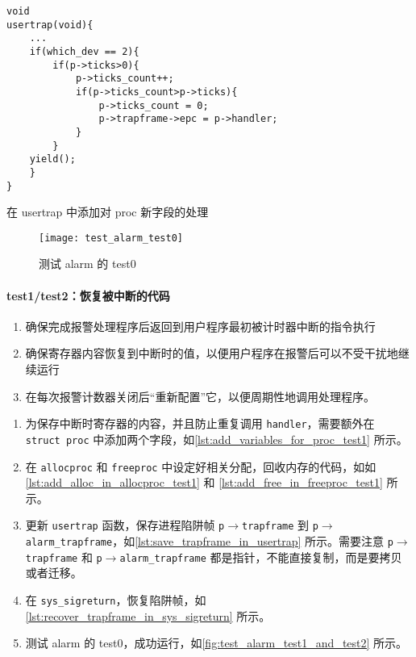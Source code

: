 \begin{listing}[!htb]
	\begin{verbatim}
void
usertrap(void){
    ...
    if(which_dev == 2){
        if(p->ticks>0){
            p->ticks_count++;
            if(p->ticks_count>p->ticks){
                p->ticks_count = 0;
                p->trapframe->epc = p->handler;
            }
        }
    yield();
    }
}
	\end{verbatim}
	\caption{在 usertrap 中添加对 proc 新字段的处理}\label{lst:add_handle_in_usertrap}
\end{listing}

\begin{figure}[!htb]
	\centering
	\texttt{[image: test\_alarm\_test0]}
	\caption{测试 alarm 的 test0}
	\label{fig:test_alarm_test0}
\end{figure}

\paragraph{test1/test2：恢复被中断的代码}

\begin{enumerate}
	\item 确保完成报警处理程序后返回到用户程序最初被计时器中断的指令执行
	\item 确保寄存器内容恢复到中断时的值，以便用户程序在报警后可以不受干扰地继续运行
	\item 在每次报警计数器关闭后“重新配置”它，以便周期性地调用处理程序。
\end{enumerate}

\begin{enumerate}
	\item 为保存中断时寄存器的内容，并且防止重复调用 \texttt{handler}，需要额外在 \texttt{struct proc} 中添加两个字段，如\cref{lst:add_variables_for_proc_test1} 所示。
	\item 在 \texttt{allocproc} 和 \texttt{freeproc} 中设定好相关分配，回收内存的代码，如如\cref{lst:add_alloc_in_allocproc_test1} 和 \cref{lst:add_free_in_freeproc_test1} 所示。
	\item 更新 \texttt{usertrap} 函数，保存进程陷阱帧 \texttt{p$\to$trapframe} 到 \texttt{p$\to$alarm\_trapframe}，如\cref{lst:save_trapframe_in_usertrap} 所示。需要注意 \texttt{p$\to$trapframe} 和 \texttt{p$\to$alarm\_trapframe} 都是指针，不能直接复制，而是要拷贝或者迁移。
	\item 在 \texttt{sys\_sigreturn}，恢复陷阱帧，如\cref{lst:recover_trapframe_in_sys_sigreturn} 所示。
	\item 测试 alarm 的 test0，成功运行，如\cref{fig:test_alarm_test1_and_test2} 所示。
\end{enumerate}

